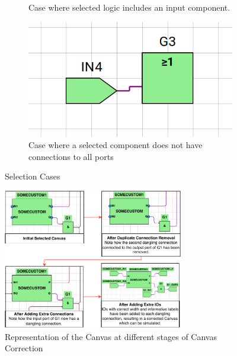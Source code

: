\begin{figure} [h]
\begin{subfigure}{0.48\textwidth}
        \caption{Case where selected logic includes an input component.}
        \label{subfig:SelCase3}
    \end{subfigure}
    \begin{subfigure}{0.48\textwidth}
        \centering
        \includegraphics[width=0.8\linewidth]{05.ImpPlan/SelCase4.png}
        \caption{Case where a selected component does not have connections to all ports}
        \label{subfig:SelCase4}
    \end{subfigure}
    \caption{Selection Cases}
    \label{fig:SelCases}
\end{figure}

\begin{figure} [h]
    \centering
    \includegraphics[width=0.7\textwidth]{05.ImpPlan/canvascorrection.drawio.pdf}
    \caption{Representation of the Canvas at different stages of Canvas Correction}
    \label{fig:CanvasCorrectionStages}
\end{figure}

